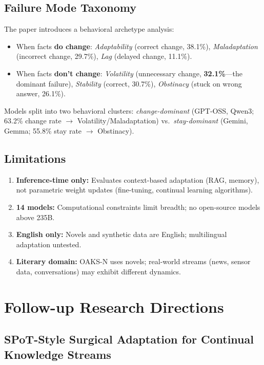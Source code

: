 \documentclass[11pt]{article}
\begin{document}
\subsection{Failure Mode Taxonomy}

The paper introduces a behavioral archetype analysis:

\begin{itemize}
    \item When facts \textbf{do change}: \emph{Adaptability} (correct change, 38.1\%), \emph{Maladaptation} (incorrect change, 29.7\%), \emph{Lag} (delayed change, 11.1\%).
    \item When facts \textbf{don't change}: \emph{Volatility} (unnecessary change, \textbf{32.1\%}---the dominant failure), \emph{Stability} (correct, 30.7\%), \emph{Obstinacy} (stuck on wrong answer, 26.1\%).
\end{itemize}

Models split into two behavioral clusters: \emph{change-dominant} (GPT-OSS, Qwen3; 63.2\% change rate $\to$ Volatility/Maladaptation) vs.\ \emph{stay-dominant} (Gemini, Gemma; 55.8\% stay rate $\to$ Obstinacy).

\subsection{Limitations}

\begin{enumerate}
    \item \textbf{Inference-time only:} Evaluates context-based adaptation (RAG, memory), not parametric weight updates (fine-tuning, continual learning algorithms).
    \item \textbf{14 models:} Computational constraints limit breadth; no open-source models above 235B.
    \item \textbf{English only:} Novels and synthetic data are English; multilingual adaptation untested.
    \item \textbf{Literary domain:} OAKS-N uses novels; real-world streams (news, sensor data, conversations) may exhibit different dynamics.
\end{enumerate}

\section{Follow-up Research Directions}

\subsection{SPoT-Style Surgical Adaptation for Continual Knowledge Streams}
\end{document}
